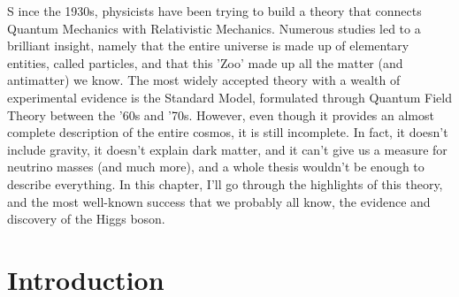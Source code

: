 \documentclass[11pt,a4paper,twoside,openright]{report}
\begin{document}
\lettrine[lines=3,loversize=0.1,lraise=0.05]{S}{} ince the 1930s, physicists have been trying to build a theory that connects Quantum Mechanics with Relativistic Mechanics. Numerous studies led to a brilliant insight, namely that the entire universe is made up of elementary entities, called particles, and that this 'Zoo' made up all the matter (and antimatter) we know. The most widely accepted theory with a wealth of experimental evidence is the Standard Model, formulated through Quantum Field Theory between the '60s and '70s. However, even though it provides an almost complete description of the entire cosmos, it is still incomplete. In fact, it doesn't include gravity, it doesn't explain dark matter, and it can't give us a measure for neutrino masses (and much more), and a whole thesis wouldn't be enough to describe everything. In this chapter, I'll go through the highlights of this theory, and the most well-known success that we probably all know, the evidence and discovery of the Higgs boson.

\section{Introduction}
\end{document}
